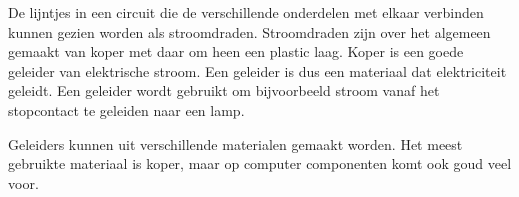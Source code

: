 De lijntjes in een circuit die de verschillende onderdelen met elkaar verbinden kunnen gezien worden als stroomdraden. Stroomdraden zijn over het algemeen gemaakt van koper met daar om heen een plastic laag. Koper is een goede geleider van elektrische stroom. Een geleider is dus een materiaal dat elektriciteit geleidt. Een geleider wordt gebruikt om bijvoorbeeld stroom vanaf het stopcontact te geleiden naar een lamp.

Geleiders kunnen uit verschillende materialen gemaakt worden. Het meest gebruikte materiaal is koper, maar op computer componenten komt ook goud veel voor.

